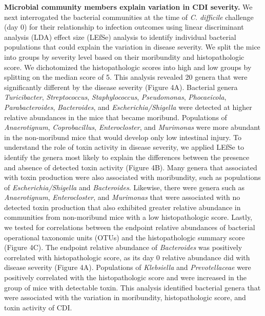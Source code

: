 \documentclass[
  12pt,
]{article}
\begin{document}
\textbf{Microbial community members explain variation in CDI severity.}
We next interrogated the bacterial communities at the time of \emph{C.
difficile} challenge (day 0) for their relationship to infection
outcomes using linear discriminant analysis (LDA) effect size (LEfSe)
analysis to identify individual bacterial populations that could explain
the variation in disease severity. We split the mice into groups by
severity level based on their moribundity and histopathologic score. We
dichotomized the histopathologic scores into high and low groups by
splitting on the median score of 5. This analysis revealed 20 genera
that were significantly different by the disease severity (Figure 4A).
Bacterial genera \emph{Turicibacter}, \emph{Streptococcus},
\emph{Staphylococcus}, \emph{Pseudomonas}, \emph{Phocaeicola},
\emph{Parabacteroides}, \emph{Bacteroides}, and
\emph{Escherichia/Shigella} were detected at higher relative abundances
in the mice that became moribund. Populations of \emph{Anaerotignum},
\emph{Coprobacillus}, \emph{Enterocloster}, and \emph{Murimonas} were
more abundant in the non-moribund mice that would develop only low
intestinal injury. To understand the role of toxin activity in disease
severity, we applied LEfSe to identify the genera most likely to explain
the differences between the presence and absence of detected toxin
activity (Figure 4B). Many genera that associated with toxin production
were also associated with moribundity, such as populations of
\emph{Escherichia/Shigella} and \emph{Bacteroides}. Likewise, there were
genera such as \emph{Anaerotignum}, \emph{Enterocloster}, and
\emph{Murimonas} that were associated with no detected toxin production
that also exhibited greater relative abundance in communities from
non-moribund mice with a low histopathologic score. Lastly, we tested
for correlations between the endpoint relative abundances of bacterial
operational taxonomic units (OTUs) and the histopathologic summary score
(Figure 4C). The endpoint relative abundance of \emph{Bacteroides} was
positively correlated with histopathologic score, as its day 0 relative
abundance did with disease severity (Figure 4A). Populations of
\emph{Klebsiella} and \emph{Prevotellaceae} were positively correlated
with the histopathologic score and were increased in the group of mice
with detectable toxin. This analysis identified bacterial genera that
were associated with the variation in moribundity, histopathologic
score, and toxin activity of CDI.
\end{document}
